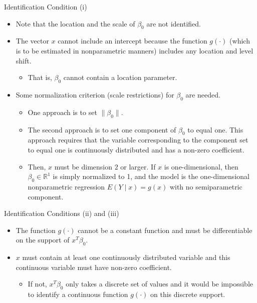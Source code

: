 \documentclass[xcolor=svgnames,dvipdfmx,cjk]{beamer}
\theoremstyle{example}
\begin{document}
\begin{frame}{Identification Condition (i)}
\begin{itemize}
  \item Note that the location and the scale of $\beta_0$ are not identified.
  \item The vector $x$ cannot include an intercept 
        because the function $g(\cdot)$ (which is to be estimated in nonparametric manners) includes any location and level shift.
        \begin{itemize}
          \item That is, $\beta_0$ cannot contain a location parameter.
        \end{itemize}
  \item Some normalization criterion (scale restrictions) for $\beta_0$ are needed.
        \begin{itemize}
          \item One approach is to set $\| \beta_0 \|$.
          \item The second approach is to set one component of $\beta_0$ to equal one. 
                This approach requires that 
                the variable corresponding to the component set to equal one 
                is continuously distributed 
                and has a non-zero coefficient.
          \item Then, $x$ must be dimension $2$ or larger. 
                If $x$ is one-dimensional, then $\beta_0 \in \mathbb{R}^1$ is simply normalized to 1, 
                and the model is the one-dimensional nonparametric regression $E(Y \mid x) = g(x)$ with no semiparametric component.
        \end{itemize}
\end{itemize}
\end{frame}

\begin{frame}{Identification Conditions (ii) and (iii)}
\begin{itemize}
  \item The function $g(\cdot)$ cannot be a constant function and must be differentiable on the support of $x^{T}\beta_0$.
  \item $x$ must contain at least one continuously distributed variable
        and this continuous variable must have non-zero coefficient.
        \begin{itemize}
          \item  If not, $x^{T} \beta_0$ only takes a discrete set of values and it would be impossible to identify a continuous function $g(\cdot)$ on this discrete support.
        \end{itemize}
\end{itemize}
\end{frame}
\end{document}
